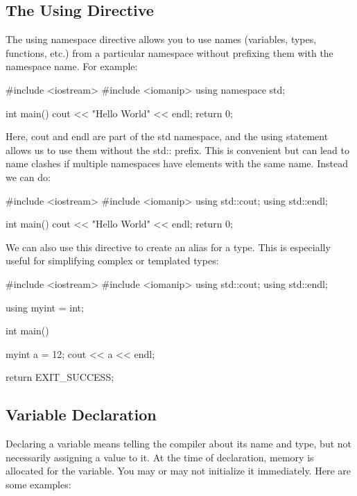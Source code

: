 \documentclass{report}
\begin{document}
    \pagebreak \bigbreak \noindent 
    \subsection{The Using Directive}
    \bigbreak \noindent 
    The using namespace directive allows you to use names (variables, types, functions, etc.) from a particular namespace without prefixing them with the namespace name. For example:
    \bigbreak \noindent 
    
    \begin{cppcode}
#include <iostream>
#include <iomanip>
using namespace std;

int main(){
    cout << "Hello World" << endl;
    return 0;
}
    \end{cppcode}
    
    \bigbreak \noindent 
    Here, cout and endl are part of the std namespace, and the using statement allows us to use them without the std:: prefix. This is convenient but can lead to name clashes if multiple namespaces have elements with the same name. Instead we can do:
    \bigbreak \noindent 
    
    \begin{cppcode}
#include <iostream>
#include <iomanip>
using std::cout;
using std::endl;

int main(){
    cout << "Hello World" << endl;
    return 0;
}
    \end{cppcode}
    
    \bigbreak \noindent 
    We can also use this directive to create an alias for a type. This is especially useful for simplifying complex or templated types:
    \bigbreak \noindent 
    
    \begin{cppcode}
#include <iostream>
#include <iomanip>
using std::cout;
using std::endl;

using myint = int;

int main() {
    
    myint a = 12;
    cout << a << endl;

    return EXIT_SUCCESS;
}
    \end{cppcode}
    

    \pagebreak \bigbreak \noindent 
    \subsection{Variable Declaration}
    \bigbreak \noindent 
    Declaring a variable means telling the compiler about its name and type, but not necessarily assigning a value to it. At the time of declaration, memory is allocated for the variable. You may or may not initialize it immediately. Here are some examples:
    \bigbreak \noindent 
    
\end{document}
